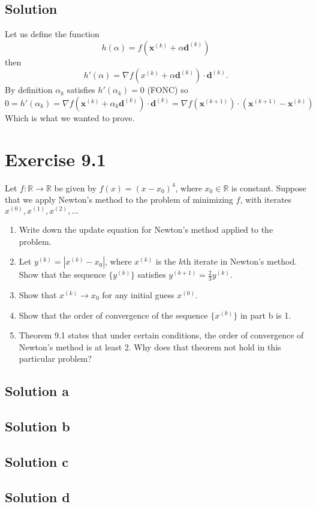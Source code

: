 \documentclass{article}
\newcommand{\bld}[1]{\boldsymbol{#1}}
\begin{document}
\subsection*{Solution}
Let us define the function
\[
	h(\alpha)=f(\bld{x}^{(k)}+\alpha\bld{d}^{(k)})
\]
then
\[
	h'(\alpha)=\nabla f(x^{(k)}+\alpha \bld{d}^{(k)}) \cdot \bld{d}^{(k)}.
\]
By definition $\alpha_k$ satisfies $h'(\alpha_k)=0$ (FONC) so
\[
	0=h'(\alpha_k)=\nabla f(\bld{x}^{(k)}+\alpha_k \bld{d}^{(k)}) \cdot
	\bld{d}^{(k)} = \nabla f(\bld{x}^{(k+1)}) \cdot
	(\bld{x}^{(k+1)}-\bld{x}^{(k)})
\]
Which is what we wanted to prove.
\section*{Exercise 9.1}
Let $f:\mathbb{R} \to \mathbb{R}$ be given by $f(x) = (x-x_0)^4$, where $x_0\in \mathbb{R}$ is constant. Suppose that we apply Newton's method to the problem of minimizing $f$, with iterates $x^{(0)},x^{(1)},x^{(2)},\dots$
\begin{enumerate}[label=\alph*.]
\item Write down the update equation for Newton's method applied to the
problem.
\item Let $y^{(k)}=|x^{(k)}-x_0|$, where $x^{(k)}$ is the $k$th iterate in
	Newton's method. Show that the sequence $\{y^{(k)}\}$ satisfies
	$y^{(k+1)}=\frac{2}{3}y^{(k)}$.
\item Show that $x^{(k)}\to x_0$ for any initial guess $x^{(0)}$.
\item Show that the order of convergence of the sequence $\{x^{(k)}\}$ in part
	b is 1.
\item Theorem 9.1 states that under certain conditions, the order of
	convergence of Newton's method is at least 2. Why does that theorem not
	hold in this particular problem?
\end{enumerate}
\subsection*{Solution a}
\subsection*{Solution b}
\subsection*{Solution c}
\subsection*{Solution d}
\end{document}
